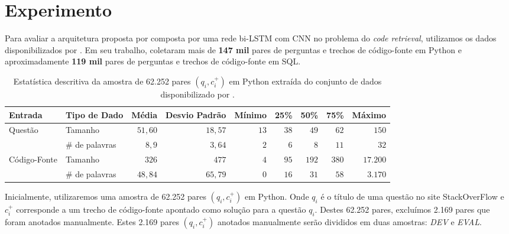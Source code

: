 \documentclass[12pt]{article}
\begin{document}




\section{Experimento}\label{sec:experimento}

Para avaliar a arquitetura proposta por \cite{tan-lstm-qa} composta por uma rede bi-LSTM com CNN no problema do \textit{code retrieval}, utilizamos os dados disponibilizados por \cite{Yao-staqc:2018}. Em seu trabalho, \cite{Yao-staqc:2018} coletaram mais de \textbf{147 mil} pares de perguntas e trechos de código-fonte em Python e aproximadamente \textbf{119 mil} pares de perguntas e trechos de código-fonte em SQL. 

\begin{table}[h]
\centering
\begin{tabular}{ l l r r r r r r r  }
\hline
\textbf{Entrada} & \textbf{Tipo de Dado} & \textbf{Média}
& \textbf{Desvio Padrão} & \textbf{Mínimo} & \textbf{25\%} & \textbf{50\%} & \textbf{75\%} & \textbf{Máximo}\\
\hline
\multirow{2}{4em}{Questão} & Tamanho & $51,60$ & $18,57$ &
$13$ & $38$ & $49$ & $62$ & $150$\\
 
 & \# de palavras & $8,9$ & $3,64$ & $2$ & $6$
 & $8$ & $11$ & $32$\\
 
 \multirow{2}{4em}{Código-Fonte} & Tamanho & $326$ & $477$ &
 $4$ & $95$ & $192$ & $380$ & $17.200$\\
 
 & \# de palavras & $48,84$ & $65,79$ & $0$ & $16$
 & $31$ & $58$ & $3.170$ \\
 
 \hline
\end{tabular}
\caption{Estatística descritiva da amostra de 62.252 pares $(q_{i}, c_{i}^{+})$ em Python extraída do conjunto de dados disponibilizado por \cite{Yao-staqc:2018}.}
\label{table:divisao-amostras}
\end{table}


Inicialmente, utilizaremos uma amostra de 62.252 pares $(q_{i}, c_{i}^{+})$ em Python. Onde $q_{i}$ é o título de uma questão no site StackOverFlow e $c_{i}^{+}$ corresponde a um trecho de código-fonte apontado como solução para a questão $q_{i}$. Destes 62.252 pares, excluímos 2.169 pares que foram anotados manualmente. Estes 2.169 pares $(q_{i}, c_{i}^{+})$ anotados manualmente serão divididos em duas amostras: \emph{DEV} e \emph{EVAL}.
\end{document}
